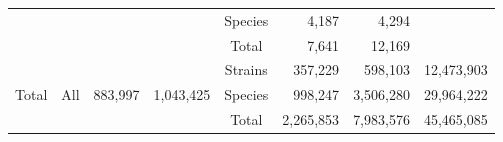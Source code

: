 \documentclass{beamer}
\begin{document}
\begin{frame}
\begin{table}[]
{\begin{tabular}{@{}cccccrcr@{}}
               &  &  &  & Species & 4,187 & \multicolumn{1}{r}{4,294} & \multicolumn{1}{l}{} \\
               &  &  &  & Total & 7,641 & \multicolumn{1}{r}{12,169} & \multicolumn{1}{l}{} \\
               \multirow{3}{*}{Total} & \multirow{3}{*}{All} & \multirow{3}{*}{883,997} & \multirow{3}{*}{1,043,425} & Strains & 357,229 & \multicolumn{1}{r}{598,103} & 12,473,903 \\
               &  &  &  & Species & 998,247 & \multicolumn{1}{r}{3,506,280} & 29,964,222 \\
               &  &  &  & Total & 2,265,853 & \multicolumn{1}{r}{7,983,576} & 45,465,085 \\ \cmidrule(l){5-8} 
               \end{tabular}%
         
            }
            \label{table:prego1}
         \end{table}
   \end{frame}
\end{document}
